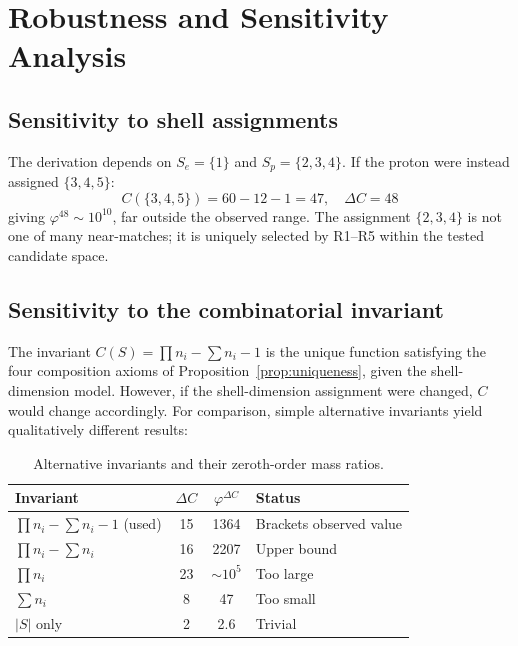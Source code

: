 \documentclass[12pt]{article}
\newcommand{\phig}{\varphi}
\begin{document}
\section{Robustness and Sensitivity Analysis}\label{sec:robustness}

\subsection{Sensitivity to shell assignments}

The derivation depends on $S_e = \{1\}$ and $S_p = \{2,3,4\}$. If the proton were instead assigned $\{3,4,5\}$:
\[
C(\{3,4,5\}) = 60 - 12 - 1 = 47, \quad \Delta C = 48
\]
giving $\phig^{48} \sim 10^{10}$, far outside the observed range. The assignment $\{2,3,4\}$ is not one of many near-matches; it is uniquely selected by R1--R5 within the tested candidate space.

\subsection{Sensitivity to the combinatorial invariant}

The invariant $C(S) = \prod n_i - \sum n_i - 1$ is the unique function satisfying the four composition axioms of Proposition~\ref{prop:uniqueness}, given the shell-dimension model. However, if the shell-dimension assignment were changed, $C$ would change accordingly. For comparison, simple alternative invariants yield qualitatively different results:

\begin{table}[ht]
\centering
\caption{Alternative invariants and their zeroth-order mass ratios.}
\label{tab:alternatives}
\begin{tabular}{@{}lccl@{}}
\toprule
Invariant & $\Delta C$ & $\phig^{\Delta C}$ & Status \\
\midrule
$\prod n_i - \sum n_i - 1$ (used) & 15 & 1364 & Brackets observed value \\
$\prod n_i - \sum n_i$ & 16 & 2207 & Upper bound \\
$\prod n_i$ & 23 & $\sim 10^5$ & Too large \\
$\sum n_i$ & 8 & 47 & Too small \\
$|S|$ only & 2 & 2.6 & Trivial \\
\bottomrule
\end{tabular}
\end{table}
\end{document}

